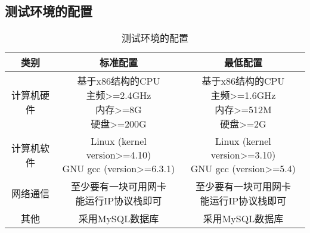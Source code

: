 \subsection{测试环境的配置}
\begin{table}[htbp]
\centering
\caption{测试环境的配置} \label{tab:test-environment}
\begin{tabular}{|c|c|c|}
    \hline
    类别 & 标准配置 & 最低配置 \\
    \hline
    计算机硬件 & \tabincell{c}{基于x86结构的CPU\\ 主频>=2.4GHz\\ 内存>=8G\\ 硬盘>=200G} & \tabincell{c}{基于x86结构的CPU\\ 主频>=1.6GHz\\ 内存>=512M\\ 硬盘>=2G} \\
    \hline
    计算机软件 & \tabincell{c}{Linux (kernel version>=4.10)\\ GNU gcc (version>=6.3.1)} & \tabincell{c}{Linux (kernel version>=3.10)\\ GNU gcc (version>=5.4)} \\
    \hline
    网络通信 & \tabincell{c}{至少要有一块可用网卡\\ 能运行IP协议栈即可} & \tabincell{c}{至少要有一块可用网卡\\ 能运行IP协议栈即可} \\
    \hline
    其他 & 采用MySQL数据库 & 采用MySQL数据库 \\
    \hline

\end{tabular}
\end{table}

